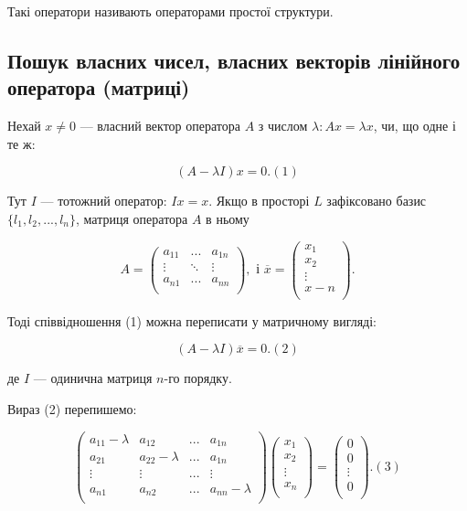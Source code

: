 Такі оператори називають операторами простої структури.

\subsection*{Пошук власних чисел, власних векторів лінійного оператора (матриці)}


Нехай $x \neq 0$ --- власний вектор оператора $A$ з числом $\lambda: A x = \lambda x$, чи, що
одне і те ж:

$$ (A - \lambda I) x = 0. (1)$$

Тут $I$ --- тотожний оператор: $Ix = x$. Якщо в просторі $L$ зафіксовано базис
$\{l_1, l_2, ..., l_n\}$, матриця оператора $A$ в ньому

$$A = \begin{pmatrix}
	a_{11} & ...    & a_{1n} \\
	\vdots & \ddots & \vdots \\
	a_{n1} & ...    & a_{nn} \\
\end{pmatrix}, \text{ і } \overline{x} = \begin{pmatrix}
	x_1 \\
	x_2 \\
	\vdots \\
	x-n \\
\end{pmatrix}.$$

Тоді співвідношення (1) можна переписати у матричному вигляді:

$$(A - \lambda I) \overline{x} = 0. (2)$$

де $I$ --- одинична матриця $n$-го порядку.

Вираз (2) перепишемо:

$$\begin{pmatrix}
	a_{11} - \lambda & a_{12} & ... & a_{1n} \\
	a_{21} & a_{22} - \lambda & ... & a_{1n} \\
	\vdots & \vdots & ... & \vdots \\
	a_{n1} & a_{n2} & ... & a_{nn} - \lambda \\
\end{pmatrix} \begin{pmatrix}
	x_1 \\
	x_2 \\
	\vdots \\
	x_n \\
\end{pmatrix} = \begin{pmatrix}
	0 \\
	0 \\
	\vdots \\
	0 \\
\end{pmatrix}. (3)$$

